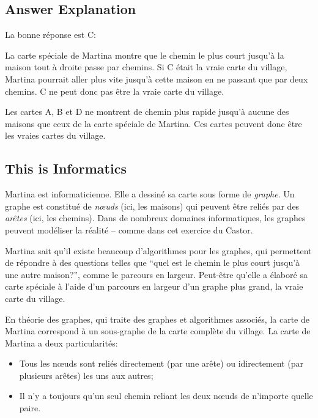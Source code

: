 \documentclass[a4paper,11pt]{report}
\newcommand{\taskGraphicsFolder}{..}
\begin{document}
\endgroup

\subsection*{Answer Explanation}

La bonne réponse est C: \raisebox{-0.5ex}{}

La carte spéciale de Martina montre que le chemin le plus court jusqu’à la maison tout à droite passe par chemins. Si C était la vraie carte du village, Martina pourrait aller plus vite jusqu’à cette maison en ne passant que par deux chemins. C ne peut donc pas être la vraie carte du village.

Les cartes A, B et D ne montrent de chemin plus rapide jusqu’à aucune des maisons que ceux de la carte spéciale de Martina. Ces cartes peuvent donc être les vraies cartes du village.


\subsection*{This is Informatics}

Martina est informaticienne. Elle a dessiné sa carte sous forme de \emph{graphe}. Un graphe est constitué de \emph{nœuds} (ici, les maisons) qui peuvent être reliés par des \emph{arêtes} (ici, les chemins). Dans de nombreux domaines informatiques, les graphes peuvent modéliser la réalité – comme dans cet exercice du Castor.

Martina sait qu’il existe beaucoup d’algorithmes pour les graphes, qui permettent de répondre à des questions telles que “quel est le chemin le plus court jusqu’à une autre maison?”, comme le parcours en largeur. Peut-être qu’elle a élaboré sa carte spéciale à l’aide d’un parcours en largeur d’un graphe plus grand, la vraie carte du village.

En théorie des graphes, qui traite des graphes et algorithmes associés, la carte de Martina correspond à un sous-graphe de la carte complète du village. La carte de Martina a deux particularités:

\begin{itemize}
  \item Tous les nœuds sont reliés directement (par une arête) ou idirectement (par plusieurs arêtes) les uns aux autres;
  \item Il n’y a toujours qu’un seul chemin reliant les deux nœuds de n’importe quelle paire.
\end{itemize}
\end{document}
